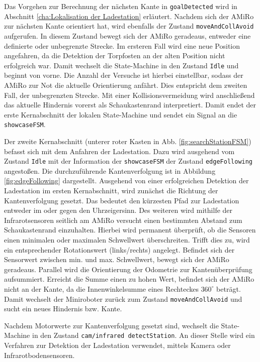 Das Vorgehen zur Berechnung der nächsten Kante in \texttt{goalDetected} wird in Abschnitt \ref{cha:Lokalisation der Ladestation} erläutert. Nachdem sich der AMiRo zur nächsten Kante orientiert hat, wird ebenfalls der Zustand \texttt{moveAndCollAvoid} aufgerufen. In diesem Zustand bewegt sich der AMiRo geradeaus, entweder eine definierte oder unbegrenzte Strecke. Im ersteren Fall wird eine neue Position angefahren, da die Detektion der Torpfosten an der alten Position nicht erfolgreich war. Damit wechselt die State-Machine in den Zustand \texttt{Idle} und beginnt von vorne. Die Anzahl der Versuche ist hierbei einstellbar, sodass der AMiRo zur Not die aktuelle Orientierung anfährt. Dies entspricht dem zweiten Fall, der unbegrenzten Strecke. Mit einer Kollisionsvermeidung wird anschließend das aktuelle Hindernis vorerst als Schaukastenrand interpretiert. Damit endet der erste Kernabschnitt der lokalen State-Machine und sendet ein Signal an die \texttt{showcaseFSM}.

Der zweite Kernabschnitt (unterer roter Kasten in Abb. \ref{fig:searchStationFSM}) befasst sich mit dem Anfahren der Ladestation. Dazu wird ausgehend vom Zustand \texttt{Idle} mit der Information der \texttt{showcaseFSM} der Zustand \texttt{edgeFollowing} angestoßen. Die durchzuführende Kantenverfolgung ist in Abbildung \ref{fig:edgeFollowing} dargestellt. Ausgehend von einer erfolgreichen Detektion der Ladestation im ersten Kernabschnitt, wird zunächst die Richtung der Kantenverfolgung gesetzt. Das bedeutet den kürzesten Pfad zur Ladestation entweder im oder gegen den Uhrzeigersinn. Des weiteren wird mithilfe der Infrarotsensoren seitlich am AMiRo versucht einen bestimmten Abstand zum Schaukastenrand einzuhalten. Hierbei wird permanent überprüft, ob die Sensoren einen minimalen oder maximalen Schwellwert überschreiten. Trifft dies zu, wird ein entsprechender Rotationswert (links/rechts) angelegt. Befindet sich der Sensorwert zwischen min. und max. Schwellwert, bewegt sich der AMiRo geradeaus. Parallel wird die Orientierung der Odometrie zur Kantenüberprüfung aufsummiert. Erreicht die Summe einen zu hohen Wert, befindet sich der AMiRo nicht an der Kante, da die Innenwinkelsumme eines Rechteckes $360^\circ$ beträgt. Damit wechselt der Miniroboter zurück zum Zustand \texttt{moveAndCollAvoid} und sucht ein neues Hindernis bzw. Kante.

Nachdem Motorwerte zur Kantenverfolgung gesetzt sind, wechselt die State-Machine in den Zustand \texttt{cam/infrared detectStation}. An dieser Stelle wird ein Verfahren zur Detektion der Ladestation verwendet, mittels Kamera oder Infrarotbodensensoren.

